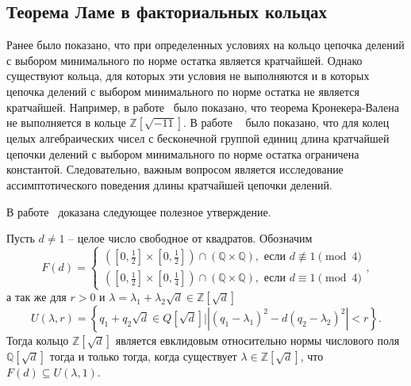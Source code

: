\documentclass[_00_dissertation.tex]{subfiles}
\begin{document}
\subsection{Теорема Ламе в факториальных кольцах}

Ранее было показано, что при определенных условиях на кольцо цепочка делений с выбором минимального по норме остатка является кратчайшей.
Однако существуют кольца, для которых эти условия не выполняются и в которых цепочка делений с выбором минимального по норме остатка не является кратчайшей.
Например, в работе~\cite{source:Rolletschek_1990} было показано, что теорема Кронекера-Валена не выполняется в кольце $\mathbb{Z}[\sqrt{-11}]$.
В работе ~\cite{source:Cooke} было показано, что для колец целых алгебраических чисел с бесконечной группой единиц длина кратчайшей цепочки делений с выбором минимального по норме остатка ограничена константой.
Следовательно, важным вопросом является исследование ассимптотического поведения длины кратчайшей цепочки делений.

В работе~\cite{source:Selfridge} доказана следующее полезное утверждение.
\begin{proposition}\label{proposition:fundamental_in_circle}
    Пусть $d \neq 1$ -- целое число свободное от квадратов.
    Обозначим
    \begin{equation*}
        F(d) = \left\{\begin{split}
            \left(
                \left[0, \frac{1}{2}\right] \times \left[0, \frac{1}{2}\right]
            \right) \cap \left(
                \mathbb{Q} \times \mathbb{Q}
            \right), \textrm{ если } d \not\equiv 1 \pmod 4\\
            \left(
                \left[0, \frac{1}{2}\right] \times \left[0, \frac{1}{4}\right]
            \right) \cap \left(
                \mathbb{Q} \times \mathbb{Q}
            \right), \textrm{ если } d \equiv 1 \pmod 4
        \end{split}\right.,
    \end{equation*}
    а так же для $r > 0$ и $\lambda = \lambda_1 + \lambda_2 \sqrt{d} \in \mathbb{Z}[\sqrt{d}]$
    \begin{equation*}
        U(\lambda, r) = \left\{
            q_1 + q_2 \sqrt{d} \in Q[\sqrt{d}] \big| |(q_1 - \lambda_1)^2 - d(q_2 - \lambda_2)^2| < r
        \right\}.
    \end{equation*}
    Тогда кольцо $\mathbb{Z}[\sqrt{d}]$ является евклидовым относительно нормы числового поля $\mathbb{Q}[\sqrt{d}]$ тогда и только тогда, когда существует $\lambda \in \mathbb{Z}[\sqrt{d}]$, что $F(d) \subseteq U(\lambda, 1)$.
\end{proposition}
\end{document}

